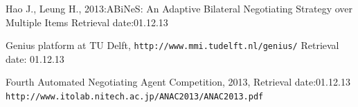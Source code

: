\documentclass[html]{report}    %
\begin{document}
\begin{thebibliography}{}

Hao J., Leung H., 2013:ABiNeS: An Adaptive Bilateral Negotiating Strategy over Multiple Items Retrieval date:01.12.13

Genius platform at TU Delft,
\texttt{http://www.mmi.tudelft.nl/genius/} Retrieval date: 01.12.13

Fourth Automated Negotiating Agent Competition, 2013, Retrieval date:01.12.13
\texttt{http://www.itolab.nitech.ac.jp/ANAC2013/ANAC2013.pdf}

\end{thebibliography}
\end{document}
